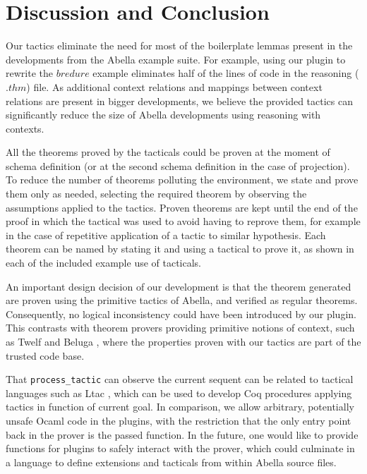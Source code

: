 \documentclass[nocopyrightspace,authoryear]{sigplanconf}
\begin{document}
\begin{comment}
The $i$th context relations \lstinline|S| can be used as the $j$th projection of a context relations \lstinline|S'| if, for each clauses \lstinline|C| of \lstinline|S|, there exists a clause \lstinline|C'| of \lstinline|S'| s.t. the $i$th formula of \lstinline|C| matches the $j$th formula of \lstinline|C'|, which is to say that the $j$th projection of the schema \lstinline|S'| is more general than the $i$th projection schema \lstinline|S| .
\end{comment}


\section{Discussion and Conclusion}
Our tactics eliminate the need for most of the boilerplate lemmas present in the developments from the Abella example suite. For example, using our plugin to rewrite the $bredure$ example eliminates half of the lines of code in the reasoning ($.thm$) file. As additional context relations and mappings between context relations are present in bigger developments, we believe the provided tactics can significantly reduce the size of Abella developments using reasoning with contexts.

All the theorems proved by the tacticals could be proven at the moment of schema definition (or at the second schema definition in the case of projection). To reduce the number of theorems polluting the environment, we state and prove them only as needed, selecting the required theorem by observing the assumptions applied to the tactics. Proven theorems are kept until the end of the proof in which the tactical was used to avoid having to reprove them, for example in the case of repetitive application of a tactic to similar hypothesis. Each theorem can be named by stating it and using a tactical to prove it, as shown in each of the included example use of tacticals.

An important design decision of our development is that the theorem generated are proven using the primitive tactics of Abella, and verified as regular theorems. Consequently, no logical inconsistency could have been introduced by our plugin. This contrasts with theorem provers providing primitive notions of context, such as Twelf \cite{twelfsys} and Beluga \cite{belugasys}, where the properties proven with our tactics are part of the trusted code base.

 That \lstinline|process_tactic| can observe the current sequent can be related to tactical languages such as Ltac \cite{ltacpap}, which can be used to develop Coq procedures applying tactics in function of current goal. In comparison, we allow arbitrary, potentially unsafe Ocaml code in the plugins, with the restriction that the only entry point back in the prover is the passed function. In the future, one would like to provide functions for plugins to safely interact with the prover, which could culminate in a language to define extensions and tacticals from within Abella source files. 







\end{document}
